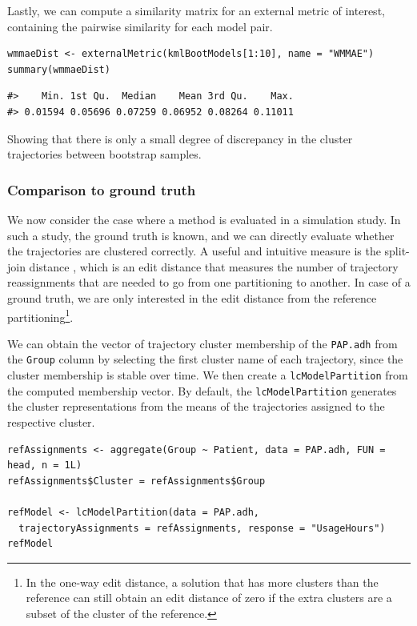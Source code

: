 Lastly, we can compute a similarity matrix for an external metric of interest, containing the pairwise similarity for each model pair.

\begin{verbatim}
wmmaeDist <- externalMetric(kmlBootModels[1:10], name = "WMMAE")
summary(wmmaeDist)
\end{verbatim}

\begin{verbatim}
#>    Min. 1st Qu.  Median    Mean 3rd Qu.    Max. 
#> 0.01594 0.05696 0.07259 0.06952 0.08264 0.11011
\end{verbatim}

Showing that there is only a small degree of discrepancy in the cluster trajectories between bootstrap samples.

\subsubsection{Comparison to ground truth}\label{comparison-to-ground-truth}

We now consider the case where a method is evaluated in a simulation study. In such a study, the ground truth is known, and we can directly evaluate whether the trajectories are clustered correctly. A useful and intuitive measure is the split-join distance \citep{dongen2000performance}, which is an edit distance that measures the number of trajectory reassignments that are needed to go from one partitioning to another. In case of a ground truth, we are only interested in the edit distance from the reference partitioning\footnote{In the one-way edit distance, a solution that has more clusters than the reference can still obtain an edit distance of zero if the extra clusters are a subset of the cluster of the reference.}.

We can obtain the vector of trajectory cluster membership of the \texttt{PAP.adh} from the \texttt{Group} column by selecting the first cluster name of each trajectory, since the cluster membership is stable over time. We then create a \texttt{lcModelPartition} from the computed membership vector. By default, the \texttt{lcModelPartition} generates the cluster representations from the means of the trajectories assigned to the respective cluster.

\begin{verbatim}
refAssignments <- aggregate(Group ~ Patient, data = PAP.adh, FUN = head, n = 1L)
refAssignments$Cluster = refAssignments$Group

refModel <- lcModelPartition(data = PAP.adh,
  trajectoryAssignments = refAssignments, response = "UsageHours")
refModel
\end{verbatim}

